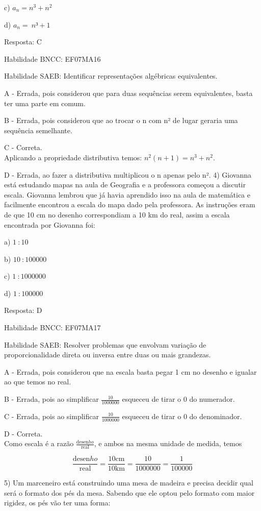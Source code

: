 c) \(a_{n} = n^{3} + n^2\)

d) \(a_{n} = \ n³ + 1\)

Resposta: C

Habilidade BNCC: EF07MA16

Habilidade SAEB: Identificar representações algébricas equivalentes.

A - Errada, pois considerou que para duas sequências serem equivalentes,
basta ter uma parte em comum.

B - Errada, pois considerou que ao trocar o n com n² de lugar geraria
uma sequência semelhante.

C - Correta.\\
Aplicando a propriedade distributiva temos:
\(n^{2}\left( n + 1 \right) = n^{3} + n^{2}.\)

D - Errada, ao fazer a distributiva multiplicou o n apenas pelo n².
4) Giovanna está estudando mapas na aula de Geografia e a professora
começou a discutir escala. Giovanna lembrou que já havia aprendido isso
na aula de matemática e facilmente encontrou a escala do mapa dado pela
professora. As instruções eram de que 10 cm no desenho correspondiam a
10 km do real, assim a escala encontrada por Giovanna foi:

a) \(1\ :10\)

b) \(10\ :100000\)

c) \(1\ :1000000\)

d) \(1\ :100000\)

Resposta: D

Habilidade BNCC: EF07MA17

Habilidade SAEB: Resolver problemas que envolvam variação de
proporcionalidade direta ou inversa entre duas ou mais grandezas.

A - Errada, pois considerou que na escala basta pegar 1 cm no desenho e
igualar ao que temos no real.

B - Errada, pois ao simplificar \(\frac{10}{1000000}\) esqueceu de tirar
o 0 do numerador.

C - Errada, pois ao simplificar \(\frac{10}{1000000}\) esqueceu de tirar
o 0 do denominador.

D - Correta.\\
Como escala é a razão \(\frac{\text{desen}ho}{\text{real}}\), e ambos na
mesma unidade de medida, temos

\[\frac{\text{desen}ho}{\text{real}} = \frac{10\text{cm}}{10\text{km}} = \frac{10}{1000000} = \frac{1}{100000}\]

5) Um marceneiro está construindo uma mesa de madeira e precisa decidir
qual será o formato dos pés da mesa. Sabendo que ele optou pelo formato
com maior rigidez, os pés vão ter uma forma:

